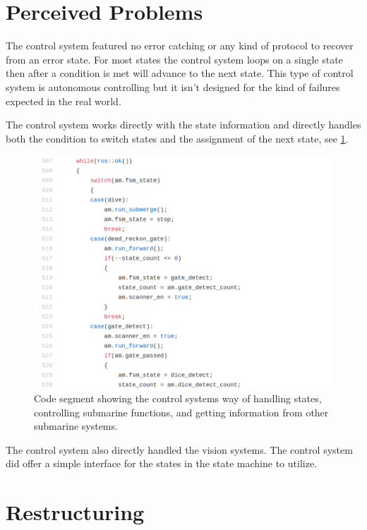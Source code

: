 \section{Perceived Problems}

The control system featured no error catching or any kind of protocol to recover from an error state.
For most states the control system loops on a single state then after a condition is met will advance to the next state. This type of control system is autonomous controlling but it isn't designed for the kind of failures expected in the real world.

The control system works directly with the state information and directly handles both the condition to switch states and the assignment of the next state, see \ref{fig:DirectStateHandling}.

\begin{figure}
\centering
\includegraphics[width=150mm]{Figures/DirectStateHandling}
\decoRule
\caption[Direct State Handling]{Code segment showing the control systems way of handling states, controlling submarine functions, and getting information from other submarine systems.}
\label{fig:DirectStateHandling}
\end{figure}

The control system also directly handled the vision systems. The control system did offer a simple interface for the states in the state machine to utilize.

%
%

\section{Restructuring}

